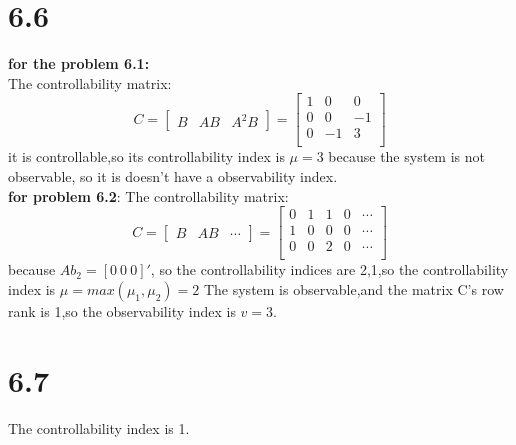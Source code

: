 \documentclass{article}
\begin{document}
\section*{6.6}
\textbf{for the problem 6.1:}\\
The controllability matrix:
\[
C=
\left[
\begin{array}{ccc}
B & AB & A^2B 
\end{array}
\right]   
=
\left[
    \begin{array}{ccc}
    1 & 0 & 0\\
    0 & 0 & -1\\
    0 & -1 & 3\\
    \end{array}
\right]
\]
it is controllable,so its controllability index is $\mu=3$
because the system is not observable, so it is doesn't have a observability index.\\
\textbf{for problem 6.2}:
The controllability matrix:
\[
C=
\left[
\begin{array}{ccc}
B & AB & \cdots
\end{array}
\right]   
=
\left[
    \begin{array}{ccccc}
    0 & 1 & 1 & 0 & \cdots \\
    1 & 0 & 0 & 0 & \cdots \\
    0 & 0 & 2 & 0 & \cdots \\
    \end{array}
\right]
\]
because $Ab_2=[0\ 0\ 0]'$, so the controllability indices are 2,1,so the controllability index is $\mu=max(\mu_1,\mu_2)=2$
The system is observable,and the matrix C's row rank is 1,so the observability index is $v=3$.

\section*{6.7}
The controllability index is 1.
\end{document}
